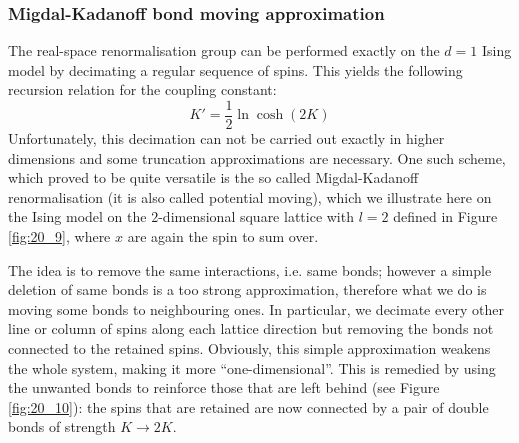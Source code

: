 \documentclass[../main/main.tex]{subfiles}
\begin{document}
\subsubsection{Migdal-Kadanoff bond moving approximation}
The real-space renormalisation group can be performed exactly on the \( d=1 \)  Ising model by decimating a regular sequence of spins. This yields the following recursion relation for the coupling constant:
\begin{equation*}
  K' = \frac{1}{2} \ln \cosh (2K)
\end{equation*}
Unfortunately, this decimation can not be carried out exactly in higher dimensions and some truncation approximations are necessary.
One such scheme, which proved to be quite versatile is the so called Migdal-Kadanoff renormalisation (it is also called potential moving), which we illustrate here on the Ising model on the \( 2 \)-dimensional square lattice with \( l=2 \) defined in Figure \ref{fig:20_9}, where \( x \) are again the spin to sum over.

The idea is to remove the same interactions, i.e. same bonds; however a simple deletion of same bonds is a too strong approximation, therefore what we do is moving some bonds to neighbouring ones. In particular, we decimate every other line or column of spins along each lattice direction but removing the bonds not connected to the retained spins. Obviously, this simple approximation weakens the whole system, making it more “one-dimensional”. This is remedied by using the unwanted bonds to reinforce those that are left behind (see Figure \ref{fig:20_10}): the spins that are retained are now connected by a pair of double bonds of strength \( K \rightarrow 2K \).
\end{document}
